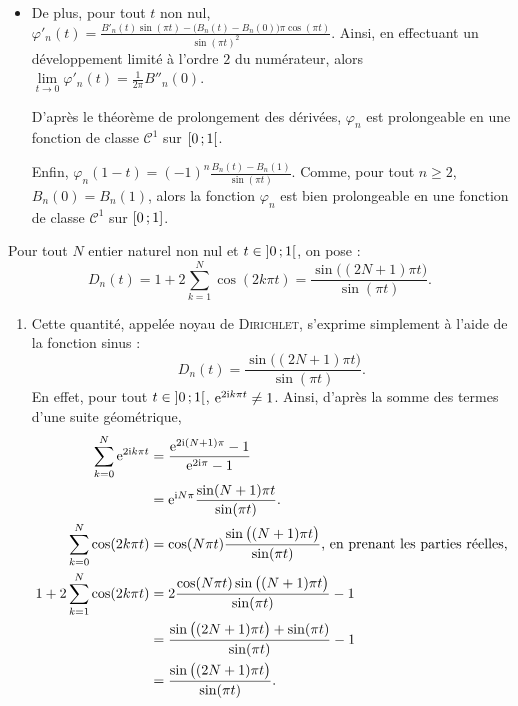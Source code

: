 \begin{elem_sol}
\begin{enumerate}[resume]
\begin{itemize}
\item
%
De plus, pour tout $t$ non nul, $\displaystyle \varphi'_n(t) = \frac{B'_n(t) \sin(\pi t) - \big(B_n(t) - B_n(0) \big) \pi \cos(\pi t)}{\sin(\pi t)^2}$. Ainsi, en effectuant un développement limité à l'ordre $2$ du numérateur, alors $\lim\limits_{t \to 0} \varphi'_n(t) = \frac{1}{2 \pi} B''_n(0)$.

D'après le théorème de prolongement des dérivées, $\varphi_n$ est prolongeable en une fonction de classe $\mathscr{C}^1$ sur $\left[0\,;1\right[$.

Enfin, $\varphi_n(1-t) = (-1)^n \frac{B_n(t) - B_n(1)}{\sin(\pi t)}$. Comme, pour tout $n \geqslant 2$, $B_n(0) = B_n(1)$, alors la fonction $\varphi_n$ est bien prolongeable en une fonction de classe $\mathscr{C}^1$ sur $\left[0\,;1\right]$.
\end{itemize}
\end{enumerate}

Pour tout $N$ entier naturel non nul et $t \in \left]0\,;1\right[$, on pose :
\[
D_n(t) = 1 + 2 \sum_{k=1}^N \cos(2k \pi t) = \frac{\sin\big((2N+1) \pi t \big)}{\sin(\pi t)}.
\]

\begin{enumerate}[resume]
\item Cette quantité, appelée noyau de \textsc{Dirichlet}, s'exprime simplement à l'aide de la fonction sinus :
\[
D_n(t) = \frac{\sin\big((2N+1) \pi t \big)}{\sin(\pi t)}.
\]
En effet, pour tout $t \in \left]0\,;1\right[$, $\mathrm{e}^{2 \mathrm{i} k \pi t} \not= 1$. Ainsi, d'après la somme des termes d'une suite géométrique, 
    \begin{align*}
        \sum_{k=0}^N \mathrm{e}^{2 \mathrm{i} k \pi t} &= \frac{\mathrm{e}^{2 \mathrm{i} (N+1) \pi} - 1}{\mathrm{e}^{2 \mathrm{i} \pi} - 1} \\
        &= \mathrm{e}^{\mathrm{i} N \pi} \frac{\sin(N+1) \pi t}{\sin(\pi t)}. \\
        \sum_{k=0}^N \cos(2 k \pi t) &= \cos(N \pi t) \frac{\sin \big((N+1) \pi t \big)}{\sin(\pi t)}\text{, en prenant les parties réelles,} \\
        1 + 2 \sum_{k=1}^N \cos(2 k \pi t) &= 2 \frac{\cos(N \pi t) \sin \big((N+1) \pi t\big)}{\sin(\pi t)} - 1 \\
        &= \frac{\sin\big((2N+1) \pi t \big) + \sin( \pi t)}{\sin(\pi t)} - 1 \\
        &= \frac{\sin\big((2N+1) \pi t \big)}{\sin(\pi t)}.
    \end{align*}


\end{enumerate}
\end{elem_sol}
